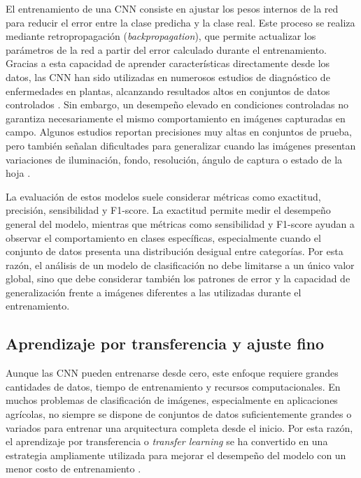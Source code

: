 El entrenamiento de una CNN consiste en ajustar los pesos internos de la red para reducir el error entre la clase predicha y la clase real.
Este proceso se realiza mediante retropropagación (\textit{backpropagation}), que permite actualizar los parámetros de la red a partir del
error calculado durante el entrenamiento. Gracias a esta capacidad de aprender características directamente desde los datos, las CNN han
sido utilizadas en numerosos estudios de diagnóstico de enfermedades en plantas, alcanzando resultados altos en conjuntos de datos
controlados \cite{agronomy13040961}. Sin embargo, un desempeño elevado en condiciones controladas no garantiza necesariamente el mismo
comportamiento en imágenes capturadas en campo. Algunos estudios reportan precisiones muy altas en conjuntos de prueba, pero también señalan dificultades para generalizar cuando
las imágenes presentan variaciones de iluminación, fondo, resolución, ángulo de captura o estado de la hoja \cite{Ahmad2023}. 

La evaluación de estos modelos suele considerar métricas como exactitud, precisión, sensibilidad y F1-score. La exactitud permite medir el
desempeño general del modelo, mientras que métricas como sensibilidad y F1-score ayudan a observar el comportamiento en clases específicas,
especialmente cuando el conjunto de datos presenta una distribución desigual entre categorías. Por esta razón, el análisis de un modelo de
clasificación no debe limitarse a un único valor global, sino que debe considerar también los patrones de error y la capacidad de
generalización frente a imágenes diferentes a las utilizadas durante el entrenamiento.


\subsection{Aprendizaje por transferencia y ajuste fino}

Aunque las CNN pueden entrenarse desde cero, este enfoque requiere grandes cantidades de datos, tiempo de entrenamiento y recursos
computacionales. En muchos problemas de clasificación de imágenes, especialmente en aplicaciones agrícolas, no siempre se dispone de
conjuntos de datos suficientemente grandes o variados para entrenar una arquitectura completa desde el inicio. Por esta razón, el aprendizaje por
transferencia o \textit{transfer learning} se ha convertido en una estrategia ampliamente utilizada para mejorar el desempeño del modelo
con un menor costo de entrenamiento \cite{zainab2025plant}.

